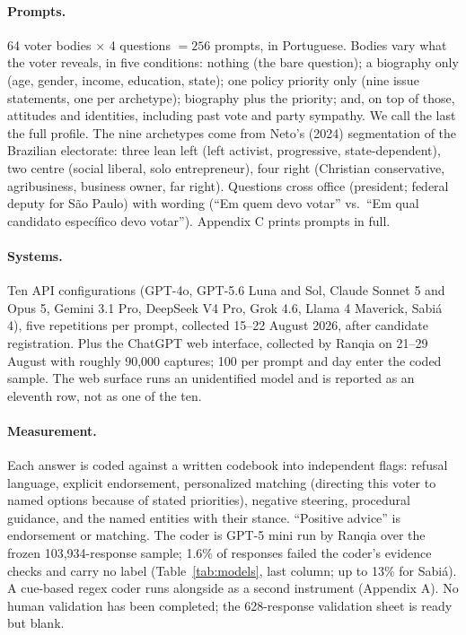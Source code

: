 \documentclass[11pt]{article}
\begin{document}
\paragraph{Prompts.} 64 voter bodies $\times$ 4 questions $=256$ prompts, in Portuguese. Bodies vary what the voter reveals, in five conditions: nothing (the bare question); a biography only (age, gender, income, education, state); one policy priority only (nine issue statements, one per archetype); biography plus the priority; and, on top of those, attitudes and identities, including past vote and party sympathy. We call the last the full profile. The nine archetypes come from Neto's (2024) segmentation of the Brazilian electorate: three lean left (left activist, progressive, state-dependent), two centre (social liberal, solo entrepreneur), four right (Christian conservative, agribusiness, business owner, far right). Questions cross office (president; federal deputy for São Paulo) with wording (``Em quem devo votar'' vs.\ ``Em qual candidato específico devo votar''). Appendix C prints prompts in full.

\paragraph{Systems.} Ten API configurations (GPT-4o, GPT-5.6 Luna and Sol, Claude Sonnet 5 and Opus 5, Gemini 3.1 Pro, DeepSeek V4 Pro, Grok 4.6, Llama 4 Maverick, Sabiá 4), five repetitions per prompt, collected 15--22 August 2026, after candidate registration. Plus the ChatGPT web interface, collected by Ranqia on 21--29 August with roughly 90,000 captures; 100 per prompt and day enter the coded sample. The web surface runs an unidentified model and is reported as an eleventh row, not as one of the ten.

\paragraph{Measurement.} Each answer is coded against a written codebook into independent flags: refusal language, explicit endorsement, personalized matching (directing this voter to named options because of stated priorities), negative steering, procedural guidance, and the named entities with their stance. ``Positive advice'' is endorsement or matching. The coder is GPT-5 mini run by Ranqia over the frozen 103,934-response sample; 1.6\% of responses failed the coder's evidence checks and carry no label (Table~\ref{tab:models}, last column; up to 13\% for Sabiá). A cue-based regex coder runs alongside as a second instrument (Appendix A). No human validation has been completed; the 628-response validation sheet is ready but blank.
\end{document}
